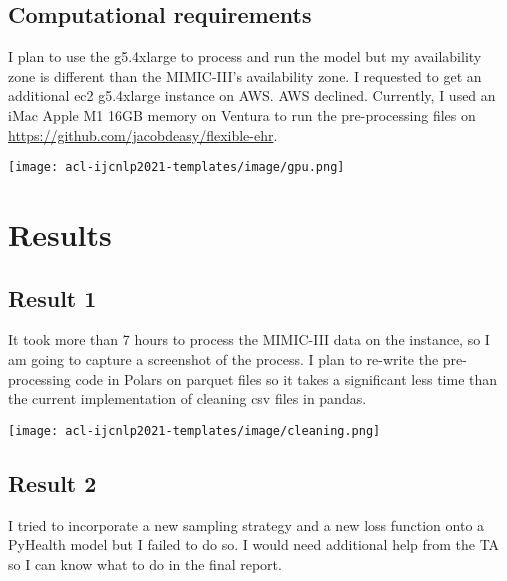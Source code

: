 \documentclass[11pt,a4paper]{article}
\begin{document}
\subsection{Computational requirements}
I plan to use the g5.4xlarge to process and run the model but my availability zone is different than the MIMIC-III's availability zone. I requested to get an additional ec2 g5.4xlarge instance on AWS. AWS declined. Currently, I used an iMac Apple M1 16GB memory on Ventura to run the pre-processing files on \url{https://github.com/jacobdeasy/flexible-ehr}. 

\texttt{[image: acl-ijcnlp2021-templates/image/gpu.png]}

\section{Results}


\subsection{Result 1}
It took more than 7 hours to process the MIMIC-III data on the instance, so I am going to capture a screenshot of the process. I plan to re-write the pre-processing code in Polars on parquet files so it takes a significant less time than the current implementation of cleaning csv files in pandas. 

\texttt{[image: acl-ijcnlp2021-templates/image/cleaning.png]}

\subsection{Result 2}
I tried to incorporate a new sampling strategy and a new loss function onto a PyHealth model but I failed to do so. I would need additional help from the TA so I can know what to do in the final report.  





\end{document}

